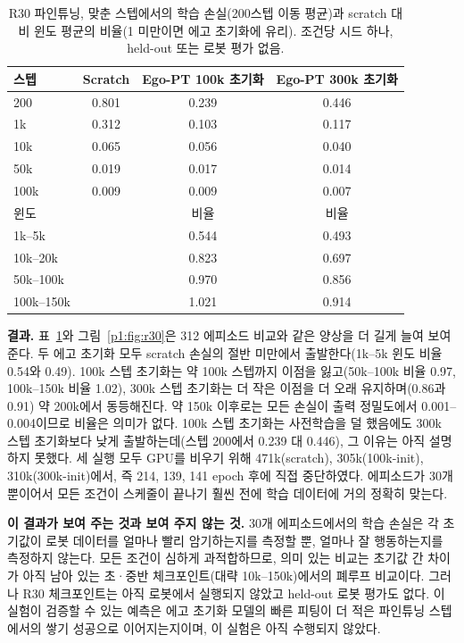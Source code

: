 \documentclass[conference,10pt]{IEEEtran}
\begin{document}
\begin{table}[t]
\centering\footnotesize\setlength{\tabcolsep}{4pt}
\caption{R30 파인튜닝, 맞춘 스텝에서의 학습 손실(200스텝 이동 평균)과 scratch 대비 윈도 평균의 비율(1 미만이면 에고 초기화에 유리).
조건당 시드 하나, held-out 또는 로봇 평가 없음.}
\label{p1:tab:r30}
\begin{tabular}{@{}lccc@{}}
\toprule
스텝 & Scratch & Ego-PT 100k 초기화 & Ego-PT 300k 초기화 \\
\midrule
200 & 0.801 & 0.239 & 0.446 \\
1k & 0.312 & 0.103 & 0.117 \\
10k & 0.065 & 0.056 & 0.040 \\
50k & 0.019 & 0.017 & 0.014 \\
100k & 0.009 & 0.009 & 0.007 \\
\midrule
윈도 & & 비율 & 비율 \\
\midrule
1k--5k & & 0.544 & 0.493 \\
10k--20k & & 0.823 & 0.697 \\
50k--100k & & 0.970 & 0.856 \\
100k--150k & & 1.021 & 0.914 \\
\bottomrule
\end{tabular}
\end{table}

\textbf{결과.} 표~\ref{p1:tab:r30}와 그림~\ref{p1:fig:r30}은 312 에피소드 비교와 같은 양상을 더 길게 늘여 보여 준다. 두 에고 초기화 모두 scratch
손실의 절반 미만에서 출발한다(1k--5k 윈도 비율 0.54와 0.49). 100k 스텝 초기화는 약 100k 스텝까지 이점을 잃고(50k--100k 비율 0.97,
100k--150k 비율 1.02), 300k 스텝 초기화는 더 작은 이점을 더 오래 유지하며(0.86과 0.91) 약 200k에서 동등해진다. 약 150k 이후로는 모든
손실이 출력 정밀도에서 0.001--0.004이므로 비율은 의미가 없다. 100k 스텝 초기화는 사전학습을 덜 했음에도 300k 스텝 초기화보다 낮게
출발하는데(스텝 200에서 0.239 대 0.446), 그 이유는 아직 설명하지 못했다. 세 실행 모두 GPU를 비우기 위해 471k(scratch), 305k(100k-init),
310k(300k-init)에서, 즉 214, 139, 141 epoch 후에 직접 중단하였다. 에피소드가 30개뿐이어서 모든 조건이 스케줄이 끝나기 훨씬 전에 학습
데이터에 거의 정확히 맞는다.

\textbf{이 결과가 보여 주는 것과 보여 주지 않는 것.} 30개 에피소드에서의 학습 손실은 각 초기값이 로봇 데이터를 얼마나 빨리 암기하는지를
측정할 뿐, 얼마나 잘 행동하는지를 측정하지 않는다. 모든 조건이 심하게 과적합하므로, 의미 있는 비교는 초기값 간 차이가 아직 남아 있는
초·중반 체크포인트(대략 10k--150k)에서의 폐루프 비교이다. 그러나 R30 체크포인트는 아직 로봇에서 실행되지 않았고 held-out 로봇 평가도
없다. 이 실험이 검증할 수 있는 예측은 에고 초기화 모델의 빠른 피팅이 더 적은 파인튜닝 스텝에서의 쌓기 성공으로 이어지는지이며, 이 실험은
아직 수행되지 않았다.
\end{document}
